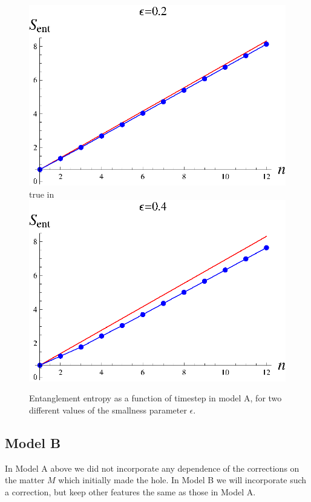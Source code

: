 \documentclass[12pt]{article}
\begin{document}
\begin{figure}[htbp]
\begin{center}
\includegraphics[scale=.58]{modela2.eps} true in
\includegraphics[scale=.58]{modela4.eps}
\caption{{Entanglement entropy as a function of timestep in model A, for  two different values of the smallness parameter $\epsilon$.}}
\label{fn4m}
\end{center}
\end{figure}

\subsection{Model B}

In Model A above we did not incorporate any dependence of the corrections on the matter $M$ which initially made the hole. In Model B we will incorporate such a correction, but keep other features the same as those in Model A.
\end{document}
